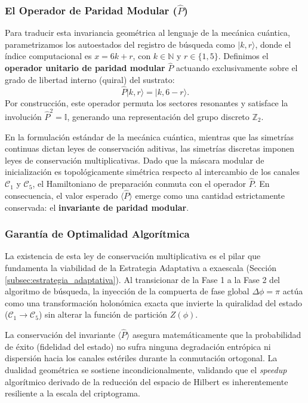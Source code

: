 \documentclass[12pt,a4paper]{article}
\theoremstyle{plain}
\theoremstyle{definition}
\theoremstyle{remark}
\begin{document}
\subsubsection*{El Operador de Paridad Modular ($\hat{P}$)}

Para traducir esta invariancia geométrica al lenguaje de la mecánica cuántica, parametrizamos los autoestados del registro de búsqueda como $|k, r\rangle$, donde el índice computacional es $x = 6k + r$, con $k \in \mathbb{N}$ y $r \in \{1, 5\}$. Definimos el \textbf{operador unitario de paridad modular} $\hat{P}$ actuando exclusivamente sobre el grado de libertad interno (quiral) del sustrato:
\begin{equation}
\hat{P} |k, r\rangle = |k, 6-r\rangle.
\end{equation}
Por construcción, este operador permuta los sectores resonantes y satisface la involución $\hat{P}^2 = \mathbb{I}$, generando una representación del grupo discreto $\mathbb{Z}_2$. 

En la formulación estándar de la mecánica cuántica, mientras que las simetrías continuas dictan leyes de conservación aditivas, las simetrías discretas imponen leyes de conservación multiplicativas. Dado que la máscara modular de inicialización es topológicamente simétrica respecto al intercambio de los canales $\mathcal{C}_1$ y $\mathcal{C}_5$, el Hamiltoniano de preparación conmuta con el operador $\hat{P}$. En consecuencia, el valor esperado $\langle \hat{P} \rangle$ emerge como una cantidad estrictamente conservada: el \textbf{invariante de paridad modular}.

\subsubsection*{Garantía de Optimalidad Algorítmica}

La existencia de esta ley de conservación multiplicativa es el pilar que fundamenta la viabilidad de la Estrategia Adaptativa a exaescala (Sección \ref{subsec:estrategia_adaptativa}). Al transicionar de la Fase 1 a la Fase 2 del algoritmo de búsqueda, la inyección de la compuerta de fase global $\Delta\phi = \pi$ actúa como una transformación holonómica exacta que invierte la quiralidad del estado ($\mathcal{C}_1 \to \mathcal{C}_5$) sin alterar la función de partición $Z(\phi)$. 

La conservación del invariante $\langle \hat{P} \rangle$ asegura matemáticamente que la probabilidad de éxito (fidelidad del estado) no sufra ninguna degradación entrópica ni dispersión hacia los canales estériles durante la conmutación ortogonal. La dualidad geométrica se sostiene incondicionalmente, validando que el \textit{speedup} algorítmico derivado de la reducción del espacio de Hilbert es inherentemente resiliente a la escala del criptograma.
\end{document}
